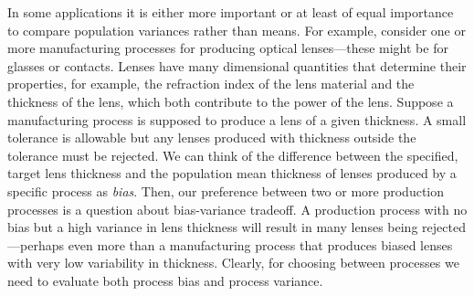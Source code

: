 \documentclass[
]{book}
\begin{document}
In some applications it is either more important or at least of equal importance to compare population variances rather than means. For example, consider one or more manufacturing processes for producing optical lenses---these might be for glasses or contacts. Lenses have many dimensional quantities that determine their properties, for example, the refraction index of the lens material and the thickness of the lens, which both contribute to the power of the lens. Suppose a manufacturing process is supposed to produce a lens of a given thickness. A small tolerance is allowable but any lenses produced with thickness outside the tolerance must be rejected. We can think of the difference between the specified, target lens thickness and the population mean thickness of lenses produced by a specific process as \emph{bias}. Then, our preference between two or more production processes is a question about bias-variance tradeoff. A production process with no bias but a high variance in lens thickness will result in many lenses being rejected---perhaps even more than a manufacturing process that produces biased lenses with very low variability in thickness. Clearly, for choosing between processes we need to evaluate both process bias and process variance.
\end{document}
